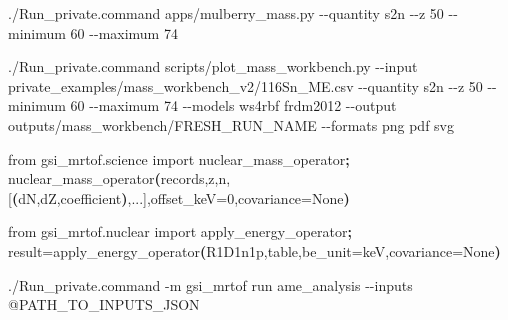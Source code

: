 \documentclass[
  11pt,
  letterpaper,
]{article}
\newenvironment{Shaded}{}{}
\newcommand{\AttributeTok}[1]{\textcolor[rgb]{0.49,0.56,0.16}{#1}}
\newcommand{\ErrorTok}[1]{\textcolor[rgb]{1.00,0.00,0.00}{\textbf{#1}}}
\newcommand{\ExtensionTok}[1]{#1}
\newcommand{\KeywordTok}[1]{\textcolor[rgb]{0.00,0.44,0.13}{\textbf{#1}}}
\newcommand{\NormalTok}[1]{#1}
\newcommand{\OperatorTok}[1]{\textcolor[rgb]{0.40,0.40,0.40}{#1}}
\newcommand{\StringTok}[1]{\textcolor[rgb]{0.25,0.44,0.63}{#1}}
\newcommand{\VariableTok}[1]{\textcolor[rgb]{0.10,0.09,0.49}{#1}}
\begin{document}
\begin{Shaded}
\begin{Highlighting}[]
\ExtensionTok{./Run\_private.command}\NormalTok{ apps/mulberry\_mass.py }\AttributeTok{{-}{-}quantity}\NormalTok{ s2n }\AttributeTok{{-}{-}z}\NormalTok{ 50 }\AttributeTok{{-}{-}minimum}\NormalTok{ 60 }\AttributeTok{{-}{-}maximum}\NormalTok{ 74}
\end{Highlighting}
\end{Shaded}

\begin{Shaded}
\begin{Highlighting}[]
\ExtensionTok{./Run\_private.command}\NormalTok{ scripts/plot\_mass\_workbench.py }\AttributeTok{{-}{-}input}\NormalTok{ private\_examples/mass\_workbench\_v2/116Sn\_ME.csv }\AttributeTok{{-}{-}quantity}\NormalTok{ s2n }\AttributeTok{{-}{-}z}\NormalTok{ 50 }\AttributeTok{{-}{-}minimum}\NormalTok{ 60 }\AttributeTok{{-}{-}maximum}\NormalTok{ 74 }\AttributeTok{{-}{-}models}\NormalTok{ ws4rbf frdm2012 }\AttributeTok{{-}{-}output}\NormalTok{ outputs/mass\_workbench/FRESH\_RUN\_NAME }\AttributeTok{{-}{-}formats}\NormalTok{ png pdf svg}
\end{Highlighting}
\end{Shaded}

\begin{Shaded}
\begin{Highlighting}[]
\ExtensionTok{from}\NormalTok{ gsi\_mrtof.science import nuclear\_mass\_operator}\KeywordTok{;} \ExtensionTok{nuclear\_mass\_operator}\ErrorTok{(}\ExtensionTok{records,z,n,[}\ErrorTok{(}\ExtensionTok{dN,dZ,coefficient}\KeywordTok{)}\ExtensionTok{,...],offset\_keV=0,covariance=None}\KeywordTok{)}
\end{Highlighting}
\end{Shaded}

\begin{Shaded}
\begin{Highlighting}[]
\ExtensionTok{from}\NormalTok{ gsi\_mrtof.nuclear import apply\_energy\_operator}\KeywordTok{;} \VariableTok{result}\OperatorTok{=}\NormalTok{apply\_energy\_operator}\KeywordTok{(}\StringTok{\textquotesingle{}R1D1n1p\textquotesingle{}}\ExtensionTok{,table,be\_unit=}\StringTok{\textquotesingle{}keV\textquotesingle{}}\ExtensionTok{,covariance=None}\KeywordTok{)}
\end{Highlighting}
\end{Shaded}

\begin{Shaded}
\begin{Highlighting}[]
\ExtensionTok{./Run\_private.command} \AttributeTok{{-}m}\NormalTok{ gsi\_mrtof run ame\_analysis }\AttributeTok{{-}{-}inputs}\NormalTok{ @PATH\_TO\_INPUTS\_JSON}
\end{Highlighting}
\end{Shaded}
\end{document}
